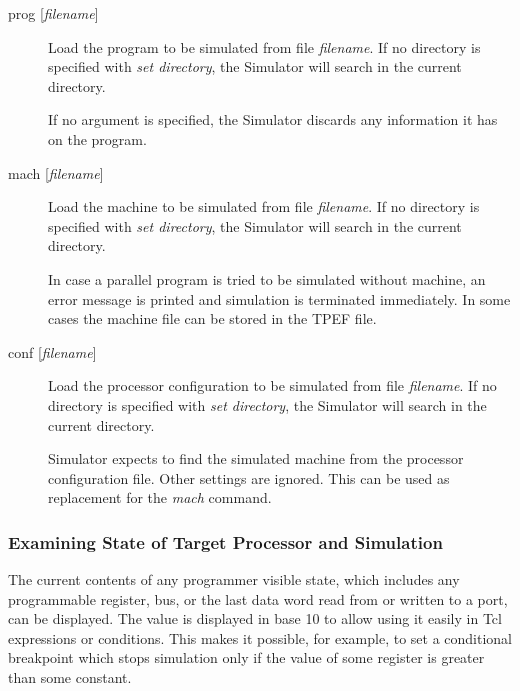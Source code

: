 \documentclass[a4paper,twoside]{tceusermanual}
\begin{document}
\begin{description}
\item[prog {[\emph{filename}]}]%
  Load the program to be simulated from file \emph{filename}.  If no
  directory is specified with \emph{set directory}, the Simulator will
  search in the current directory.

  If no argument is specified, the Simulator discards any information it has
  on the program.

\item[mach {[\emph{filename}]}]%
  Load the machine to be simulated from file \emph{filename}.  If no
  directory is specified with \emph{set directory}, the Simulator will
  search in the current directory.

  In case a parallel program is tried to be simulated without machine,
  an error message is printed and simulation is terminated immediately.
  In some cases the machine file can be stored in the TPEF file.

\item[conf {[\emph{filename}]}]%
  Load the processor configuration to be simulated from file \emph{filename}.
  If no directory is specified with \emph{set directory}, the Simulator will
  search in the current directory.

  Simulator expects to find the simulated machine from the processor 
  configuration file. Other settings are ignored. This can be used as
  replacement for the \emph{mach} command.

\end{description}

\subsubsection{Examining State of Target Processor and Simulation}
\label{ssec:debug-state}

The current contents of any programmer visible state, which includes any
programmable register, bus, or the last data word read from or written to a
port, can be displayed. The value is displayed in base 10 to allow using it
easily in Tcl expressions or conditions. This makes it possible, for
example, to set a conditional breakpoint which stops simulation only if the
value of some register is greater than some constant.
\end{document}
